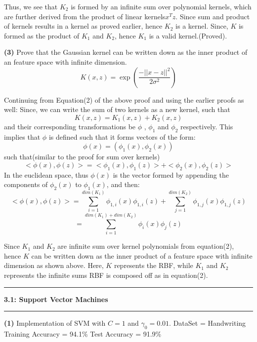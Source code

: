 \documentclass{article}
\newcommand\question[2]{\vspace{.25in}\hrule\textbf{#1: #2}\hrule\vspace{.10in}}
\renewcommand\part[1]{\vspace{.10in}\textbf{(#1)}}
\begin{document}
    Thus, we see that $K_2$ is formed by an infinite sum over polynomial kernels, which are further derived from the product of linear kernels$x^Tz$. Since sum and product of kernels results in a kernel as proved earlier, hence $K_2$ is a kernel. \newline
    Since, $K$ is formed as the product of $K_1$ and $K_2$, hence $K_1$ is a valid kernel.(Proved). \newline

    \part{3} Prove that the Gaussian kernel can be written down as the inner product of an feature space with infinite dimension. 
    \[K(x,z) = \exp(\dfrac{-||x-z||^2}{2{\sigma}^2})\]

    Continuing from Equation(2) of the above proof and using the earlier proofs as well: \newline
    Since, we can write the sum of two kernels as a new kernel, such that
    \[K(x,z) = K_1(x,z) + K_2(x,z)\]
    and their corresponding transformations be $\phi$ , $\phi_1$ and $\phi_2$ respectively. This implies that $\phi$ is defined such that it forms vectors of the form:
    \[ \phi(x) = (\phi_1(x), \phi_2(x))\]
    such that(similar to the proof for sum over kernels)
   \[ <\phi(x),\phi(z)> = <\phi_1(x), \phi_1(z)> + <\phi_2(x), \phi_2(z)>\]
   In the euclidean space, thus $\phi(x)$ is the vector formed by appending the components of $\phi_2(x)$ to $\phi_1(x)$, and then:
   \[<\phi(x), \phi(z)> = \sum_{i=1}^{dim(K_1)} \phi_{1,i}(x)\phi_{1,i}(z) + \sum_{j=1}^{dim(K_2)} \phi_{1,j}(x)\phi_{1,j}(z)\]
   \[ = \sum_{i=1}^{dim(K_1)+dim(K_2)} \phi_{i}(x)\phi_{j}(z)\]

   Since $K_1$ and $K_2$ are infinite sum over kernel polynomials from equation(2), hence $K$ can be written down as the inner product of a feature space with infinite dimension as shown above. Here, $K$ represents the RBF, while $K_1$ and $K_2$ represents the infinite sums RBF is composed off as in equation(2). \newline

   \question{3.1}{Support Vector Machines}
   \part{1} Implementation of SVM with $C=1$ and $\gamma_0 = 0.01$. \newline
   DataSet = Handwriting \newline
   Training Accuracy = 94.1\% \newline
   Test Accuracy = 91.9\% \newline
\end{document}

